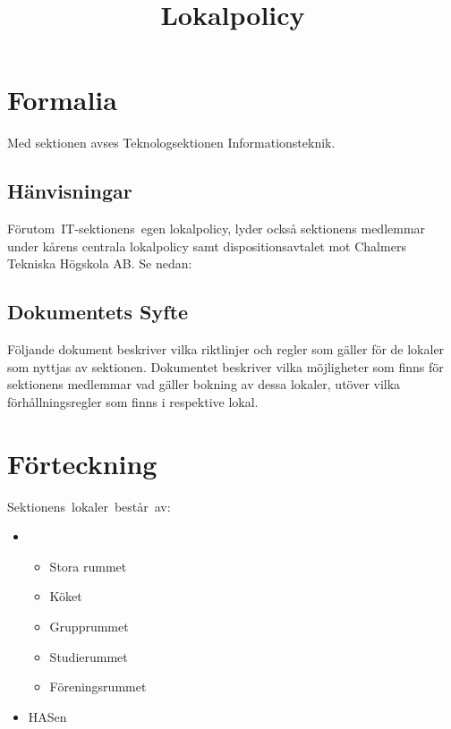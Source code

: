 \documentclass[11pt, includeaddress]{classes/cthit}
\begin{document}
\title{Lokalpolicy}

\maketitle

\thispagestyle{empty}

\newpage

\makeheadfoot%

\setcounter{tocdepth}{2}
\setcounter{page}{1}
\tableofcontents

\newpage



\section{Formalia}
Med sektionen avses Teknologsektionen Informationsteknik.

\subsection{Hänvisningar}
Förutom IT­-sektionens egen lokalpolicy, lyder också sektionens medlemmar under kårens centrala lokalpolicy samt dispositionsavtalet mot Chalmers
Tekniska Högskola AB. Se nedan:
\newline
{}\\

\subsection{Dokumentets Syfte}
Följande dokument beskriver vilka riktlinjer och regler som gäller för de lokaler som nyttjas av
sektionen. Dokumentet beskriver vilka möjligheter som finns för sektionens medlemmar vad gäller
bokning av dessa lokaler, utöver vilka förhållningsregler som finns i respektive lokal.

\section{Förteckning}
Sektionens lokaler består av:
\begin{itemize}
  \item \HUBBEN\
  	\begin{itemize}
	  \item Stora rummet
	  \item Köket
	  \item Grupprummet
	  \item Studierummet
	  \item Föreningsrummet
	\end{itemize}
   \item HASen
\end{itemize}
\end{document}
